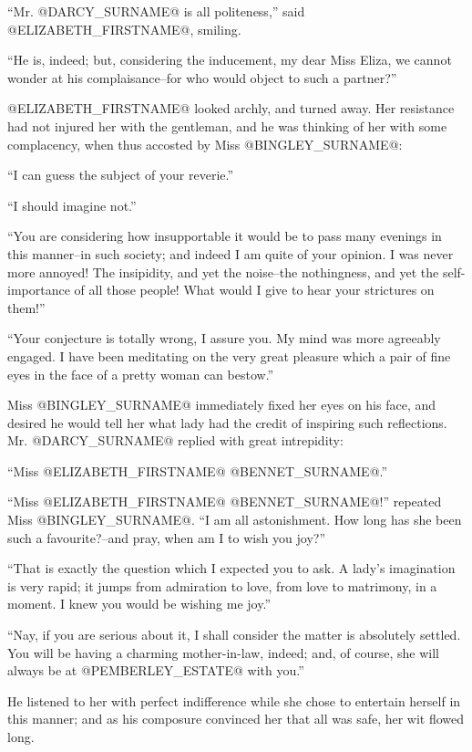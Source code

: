 ``Mr. @DARCY_SURNAME@ is all politeness,'' said @ELIZABETH_FIRSTNAME@, smiling.

``He is, indeed; but, considering the inducement, my dear Miss Eliza,
we cannot wonder at his complaisance--for who would object to such a
partner?''

@ELIZABETH_FIRSTNAME@ looked archly, and turned away. Her resistance had not
injured her with the gentleman, and he was thinking of her with some
complacency, when thus accosted by Miss @BINGLEY_SURNAME@:

``I can guess the subject of your reverie.''

``I should imagine not.''

``You are considering how insupportable it would be to pass many evenings
in this manner--in such society; and indeed I am quite of your opinion.
I was never more annoyed! The insipidity, and yet the noise--the
nothingness, and yet the self-importance of all those people! What would
I give to hear your strictures on them!''

``Your conjecture is totally wrong, I assure you. My mind was more
agreeably engaged. I have been meditating on the very great pleasure
which a pair of fine eyes in the face of a pretty woman can bestow.''

Miss @BINGLEY_SURNAME@ immediately fixed her eyes on his face, and desired he
would tell her what lady had the credit of inspiring such reflections.
Mr. @DARCY_SURNAME@ replied with great intrepidity:

``Miss @ELIZABETH_FIRSTNAME@ @BENNET_SURNAME@.''

``Miss @ELIZABETH_FIRSTNAME@ @BENNET_SURNAME@!'' repeated Miss @BINGLEY_SURNAME@. ``I am all astonishment.
How long has she been such a favourite?--and pray, when am I to wish you
joy?''

``That is exactly the question which I expected you to ask. A lady's
imagination is very rapid; it jumps from admiration to love, from love
to matrimony, in a moment. I knew you would be wishing me joy.''

``Nay, if you are serious about it, I shall consider the matter is
absolutely settled. You will be having a charming mother-in-law, indeed;
and, of course, she will always be at @PEMBERLEY_ESTATE@ with you.''

He listened to her with perfect indifference while she chose to
entertain herself in this manner; and as his composure convinced her
that all was safe, her wit flowed long.



